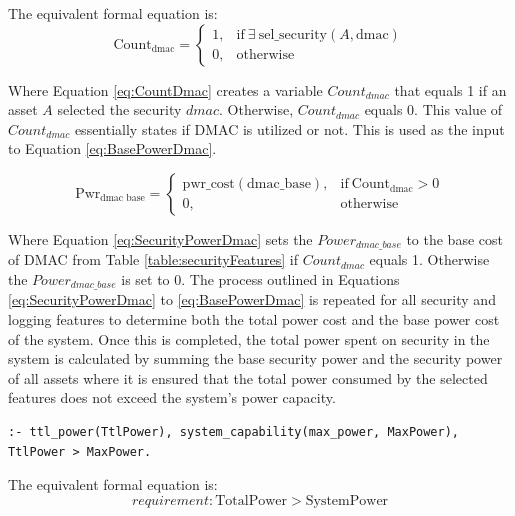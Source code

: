 The equivalent formal equation is:
\begin{equation}
\label{eq:CountDmac}
\text{Count}_{\text{dmac}} = 
\begin{cases} 
1, & \text{if} \ \exists \ \text{sel\_security}(A, \text{dmac}) \\
0, & \text{otherwise}
\end{cases}
\end{equation}

Where Equation \ref{eq:CountDmac} creates a variable \(Count_{dmac}\) that equals 1 if an asset \(A\) selected the security \(dmac\). Otherwise, \(Count_{dmac}\) equals 0. This value of \(Count_{dmac}\) essentially states if DMAC is utilized or not. This is used as the input to Equation \ref{eq:BasePowerDmac}.

\begin{equation}
\label{eq:BasePowerDmac}
\text{Pwr}_{\text{dmac base}} = 
\begin{cases} 
\text{pwr\_cost}(\text{dmac\_base}), & \text{if} \ \text{Count}_{\text{dmac}} > 0 \\
0, & \text{otherwise}
\end{cases}
\end{equation}

Where Equation \ref{eq:SecurityPowerDmac} sets the \(Power_{dmac\_base}\) to the base cost of DMAC from Table \ref{table:securityFeatures} if \(Count_{dmac}\) equals 1. Otherwise the \(Power_{dmac\_base}\) is set to 0.
The process outlined in Equations \ref{eq:SecurityPowerDmac} to \ref{eq:BasePowerDmac} is repeated for all security and logging features to determine both the total power cost and the base power cost of the system. Once this is completed, the total power spent on security in the system is calculated by summing the base security power and the security power of all assets where it is ensured that the total power consumed by the selected features does not exceed the system's power capacity. 

\begin{verbatim}
:- ttl_power(TtlPower), system_capability(max_power, MaxPower), TtlPower > MaxPower.
\end{verbatim}
The equivalent formal equation is:
\begin{equation}
\label{eq:powerRequirement}
requirement: \text{TotalPower} > \text{SystemPower}
\end{equation}


